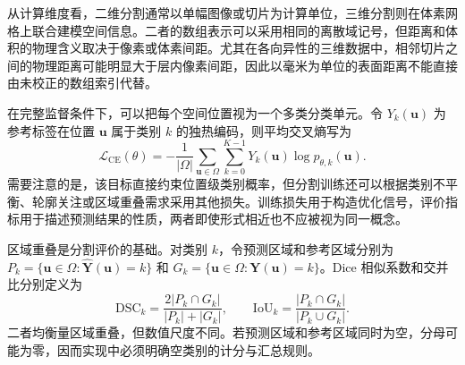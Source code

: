 从计算维度看，二维分割通常以单幅图像或切片为计算单位，三维分割则在体素网格上联合建模空间信息。二者的数组表示可以采用相同的离散域记号，但距离和体积的物理含义取决于像素或体素间距。尤其在各向异性的三维数据中，相邻切片之间的物理距离可能明显大于层内像素间距，因此以毫米为单位的表面距离不能直接由未校正的数组索引代替。

在完整监督条件下，可以把每个空间位置视为一个多类分类单元。令 $Y_k(\mathbf{u})$ 为参考标签在位置 $\mathbf{u}$ 属于类别 $k$ 的独热编码，则平均交叉熵写为
\begin{equation}
\mathcal{L}_{\mathrm{CE}}(\theta)
=-\frac{1}{|\Omega|}
\sum_{\mathbf{u}\in\Omega}\sum_{k=0}^{K-1}
Y_k(\mathbf{u})\log p_{\theta,k}(\mathbf{u}).
\label{eq:foundations-seg-ce}
\end{equation}
需要注意的是，该目标直接约束位置级类别概率，但分割训练还可以根据类别不平衡、轮廓关注或区域重叠需求采用其他损失。训练损失用于构造优化信号，评价指标用于描述预测结果的性质，两者即使形式相近也不应被视为同一概念。

区域重叠是分割评价的基础。对类别 $k$，令预测区域和参考区域分别为
$P_k=\{\mathbf{u}\in\Omega:\widehat{\mathbf{Y}}(\mathbf{u})=k\}$ 和
$G_k=\{\mathbf{u}\in\Omega:\mathbf{Y}(\mathbf{u})=k\}$。Dice 相似系数和交并比分别定义为\cite{taha2015metrics}
\begin{equation}
\mathrm{DSC}_k=\frac{2|P_k\cap G_k|}{|P_k|+|G_k|},\qquad
\mathrm{IoU}_k=\frac{|P_k\cap G_k|}{|P_k\cup G_k|}.
\label{eq:foundations-seg-overlap}
\end{equation}
二者均衡量区域重叠，但数值尺度不同。若预测区域和参考区域同时为空，分母可能为零，因而实现中必须明确空类别的计分与汇总规则。

